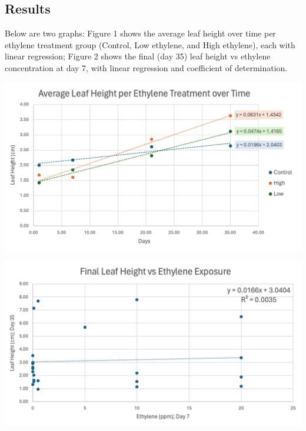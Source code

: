 \documentclass{report}
\newenvironment{Figure}
  {\par\medskip\noindent\minipage{\linewidth}}
  {\endminipage\par\medskip}
\begin{document}
\begin{multicols}{3}
  \section*{Results}
  Below are two graphs: Figure 1 shows the average leaf height over time per ethylene treatment group (Control, Low ethylene, and High ethylene), each with linear regression; Figure 2 shows the final (day 35) leaf height vs ethylene concentration at day 7, with linear regression and coefficient of determination.
  \begin{Figure}
    \centering
    \includegraphics[width=\linewidth]{graph1.png}
  \end{Figure}
  \vfill\null
  \columnbreak
  \begin{Figure}
    \centering
    \includegraphics[width=\linewidth]{graph2.png}
  \end{Figure}

\end{multicols}
\end{document}

